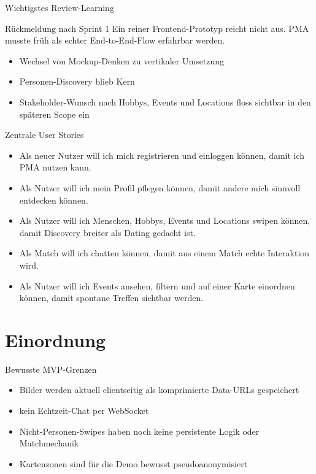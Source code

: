 \documentclass[
amberg,
compressedtitleimages,
toc=fancy,
footlinebox,
nometaot
]{OTHAWbeamer}
\begin{document}
\begin{frame}{Wichtigstes Review-Learning}
  \begin{block}{Rückmeldung nach Sprint 1}
    Ein reiner Frontend-Prototyp reicht nicht aus. PMA musste früh als echter End-to-End-Flow erfahrbar werden.
  \end{block}

  \begin{itemize}
    \item Wechsel von Mockup-Denken zu vertikaler Umsetzung
    \item Personen-Discovery blieb Kern
    \item Stakeholder-Wunsch nach Hobbys, Events und Locations floss sichtbar in den späteren Scope ein
  \end{itemize}
\end{frame}

\begin{frame}{Zentrale User Stories}
  \begin{itemize}
    \item Als neuer Nutzer will ich mich registrieren und einloggen können, damit ich PMA nutzen kann.
    \item Als Nutzer will ich mein Profil pflegen können, damit andere mich sinnvoll entdecken können.
    \item Als Nutzer will ich Menschen, Hobbys, Events und Locations swipen können, damit Discovery breiter als Dating gedacht ist.
    \item Als Match will ich chatten können, damit aus einem Match echte Interaktion wird.
    \item Als Nutzer will ich Events ansehen, filtern und auf einer Karte einordnen können, damit spontane Treffen sichtbar werden.
  \end{itemize}
\end{frame}

\section{Einordnung}

\begin{frame}{Bewusste MVP-Grenzen}
  \begin{itemize}
    \item Bilder werden aktuell clientseitig als komprimierte Data-URLs gespeichert
    \item kein Echtzeit-Chat per WebSocket
    \item Nicht-Personen-Swipes haben noch keine persistente Logik oder Matchmechanik
    \item Kartenzonen sind für die Demo bewusst pseudoanonymisiert
  \end{itemize}
\end{frame}
\end{document}
